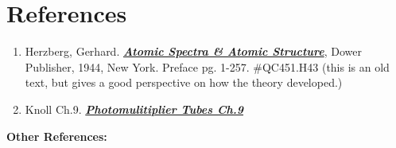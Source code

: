 \documentclass{../lab}
\begin{document}
\section{References}
\label{sec:References}

\begin{enumerate}
    \item Herzberg, Gerhard. \emph{\href{http://physics111.lib.berkeley.edu/Physics111/Reprints/ATM/02-2ndEd-Atomic\_Spectra\_and\_Atomic\_Structure.pdf}{\textbf{Atomic Spectra \& Atomic Structure}}}, Dower Publisher, 1944, New York. Preface pg. 1-257. \#QC451.H43 (this is an old text, but gives a good perspective on how the theory developed.)

    \item Knoll Ch.9. \emph{\href{http://physics111.lib.berkeley.edu/Physics111/Reprints/Knoll-Radiation\%20Detection\%20&\%20Measurement/01-Radiation\_Detection\_and\_Measurement\_CH\_09.pdf}{\textbf{Photomulitiplier Tubes Ch.9}}}

\end{enumerate}

\noindent\textbf{Other References:}
\end{document}
